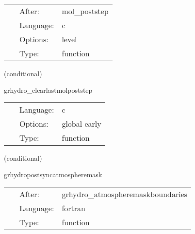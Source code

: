 \hspace{5mm}{\it reset inlastmolpoststep to zero } 


\hspace{5mm}

 \begin{tabular*}{160mm}{cll} 
~ & After:  & mol\_poststep \\ 
~ & Language:  & c \\ 
~ & Options:  & level \\ 
~ & Type:  & function \\ 
\end{tabular*} 


\vspace{5mm}

   (conditional) 

\hspace{5mm} grhydro\_clearlastmolpoststep 

\hspace{5mm}{\it initialize inlastmolpoststep to zero } 


\hspace{5mm}

 \begin{tabular*}{160mm}{cll} 
~ & Language:  & c \\ 
~ & Options:  & global-early \\ 
~ & Type:  & function \\ 
\end{tabular*} 


\vspace{5mm}

   (conditional) 

\hspace{5mm} grhydropostsyncatmospheremask 

\hspace{5mm}{\it set integer atmosphere mask from synchronized real atmosphere mask } 


\hspace{5mm}

 \begin{tabular*}{160mm}{cll} 
~ & After:  & grhydro\_atmospheremaskboundaries \\ 
~ & Language:  & fortran \\ 
~ & Type:  & function \\ 
\end{tabular*} 


\vspace{5mm}

